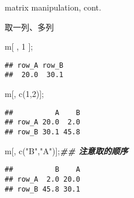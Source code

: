 \documentclass[ignorenonframetext,]{beamer}
\newenvironment{Shaded}{\begin{snugshade}}{\end{snugshade}}
\newcommand{\DecValTok}[1]{\textcolor[rgb]{0.00,0.00,0.81}{#1}}
\newcommand{\DocumentationTok}[1]{\textcolor[rgb]{0.56,0.35,0.01}{\textbf{\textit{#1}}}}
\newcommand{\FunctionTok}[1]{\textcolor[rgb]{0.00,0.00,0.00}{#1}}
\newcommand{\NormalTok}[1]{#1}
\newcommand{\StringTok}[1]{\textcolor[rgb]{0.31,0.60,0.02}{#1}}
\newcommand\FontSmall{\fontsize{7}{8}\selectfont}
\begin{document}
\begin{frame}[fragile]{matrix manipulation, cont.}
\protect\hypertarget{matrix-manipulation-cont.-1}{}
\begin{block}{取一列、多列}
\protect\hypertarget{ux53d6ux4e00ux5217ux591aux5217}{}
\FontSmall

\begin{Shaded}
\begin{Highlighting}[]
\NormalTok{m[ , }\DecValTok{1}\NormalTok{ ];}
\end{Highlighting}
\end{Shaded}

\begin{verbatim}
## row_A row_B 
##  20.0  30.1
\end{verbatim}

\begin{Shaded}
\begin{Highlighting}[]
\NormalTok{m[, }\FunctionTok{c}\NormalTok{(}\DecValTok{1}\NormalTok{,}\DecValTok{2}\NormalTok{)];}
\end{Highlighting}
\end{Shaded}

\begin{verbatim}
##          A    B
## row_A 20.0  2.0
## row_B 30.1 45.8
\end{verbatim}

\begin{Shaded}
\begin{Highlighting}[]
\NormalTok{m[, }\FunctionTok{c}\NormalTok{(}\StringTok{"B"}\NormalTok{,}\StringTok{"A"}\NormalTok{)];}\DocumentationTok{\#\# 注意取的顺序}
\end{Highlighting}
\end{Shaded}

\begin{verbatim}
##          B    A
## row_A  2.0 20.0
## row_B 45.8 30.1
\end{verbatim}
\end{block}
\end{frame}
\end{document}
